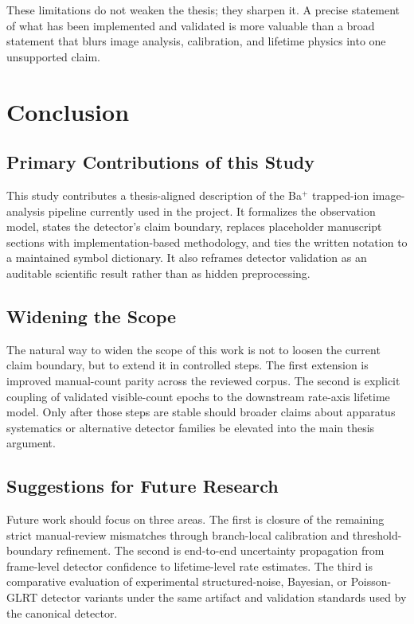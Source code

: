 \documentclass[12pt]{report}
\begin{document}
These limitations do not weaken the thesis; they sharpen it. A precise statement of what has been implemented and validated is more valuable than a broad statement that blurs image analysis, calibration, and lifetime physics into one unsupported claim.

\chapter{Conclusion}

\section{Primary Contributions of this Study}

This study contributes a thesis-aligned description of the Ba$^+$ trapped-ion image-analysis pipeline currently used in the project. It formalizes the observation model, states the detector's claim boundary, replaces placeholder manuscript sections with implementation-based methodology, and ties the written notation to a maintained symbol dictionary. It also reframes detector validation as an auditable scientific result rather than as hidden preprocessing.

\section{Widening the Scope}

The natural way to widen the scope of this work is not to loosen the current claim boundary, but to extend it in controlled steps. The first extension is improved manual-count parity across the reviewed corpus. The second is explicit coupling of validated visible-count epochs to the downstream rate-axis lifetime model. Only after those steps are stable should broader claims about apparatus systematics or alternative detector families be elevated into the main thesis argument.

\section{Suggestions for Future Research}

Future work should focus on three areas. The first is closure of the remaining strict manual-review mismatches through branch-local calibration and threshold-boundary refinement. The second is end-to-end uncertainty propagation from frame-level detector confidence to lifetime-level rate estimates. The third is comparative evaluation of experimental structured-noise, Bayesian, or Poisson-GLRT detector variants under the same artifact and validation standards used by the canonical detector.
\end{document}
